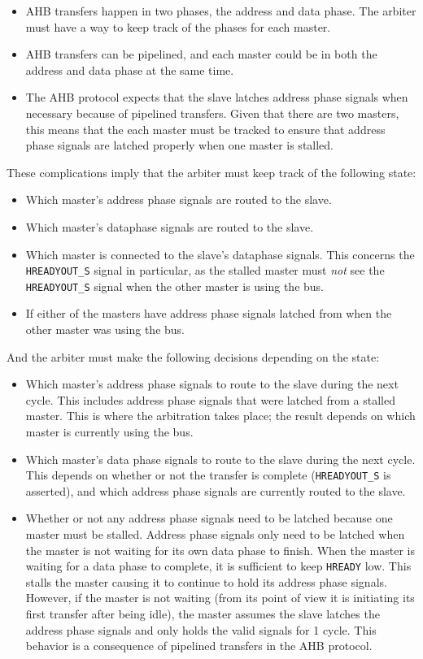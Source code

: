 \begin{itemize}
	\item AHB transfers happen in two phases, the address and data phase. The arbiter must have a way to keep track of the phases for each master.
	\item AHB transfers can be pipelined, and each master could be in both the address and data phase at the same time.
	\item The AHB protocol expects that the slave latches address phase signals when necessary because of pipelined transfers. Given that there are two masters, this means that the each master must be tracked to ensure that address phase signals are latched properly when one master is stalled.
\end{itemize}

These complications imply that the arbiter must keep track of the following state:

\begin{itemize}
	\item Which master's address phase signals are routed to the slave.
	\item Which master's dataphase signals are routed to the slave.
	\item Which master is connected to the slave's dataphase signals. This concerns the \texttt{HREADYOUT\_S} signal in particular, as the stalled master must \textit{not} see the \texttt{HREADYOUT\_S} signal when the other master is using the bus.
	\item If either of the masters have address phase signals latched from when the other master was using the bus.
\end{itemize}

And the arbiter must make the following decisions depending on the state:

\begin{itemize}
	\item Which master's address phase signals to route to the slave during the next cycle. This includes address phase signals that were latched from a stalled master. This is where the arbitration takes place; the result depends on which master is currently using the bus.
	\item Which master's data phase signals to route to the slave during the next cycle. This depends on whether or not the transfer is complete (\texttt{HREADYOUT\_S} is asserted), and which address phase signals are currently routed to the slave.
	\item Whether or not any address phase signals need to be latched because one master must be stalled. Address phase signals only need to be latched when the master is not waiting for its own data phase to finish. When the master is waiting for a data phase to complete, it is sufficient to keep \texttt{HREADY} low. This stalls the master causing it to continue to hold its address phase signals. However, if the master is not waiting (from its point of view it is initiating its first transfer after being idle), the master assumes the slave latches the address phase signals and only holds the valid signals for 1 cycle. This behavior is a consequence of pipelined transfers in the AHB protocol.
\end{itemize}

